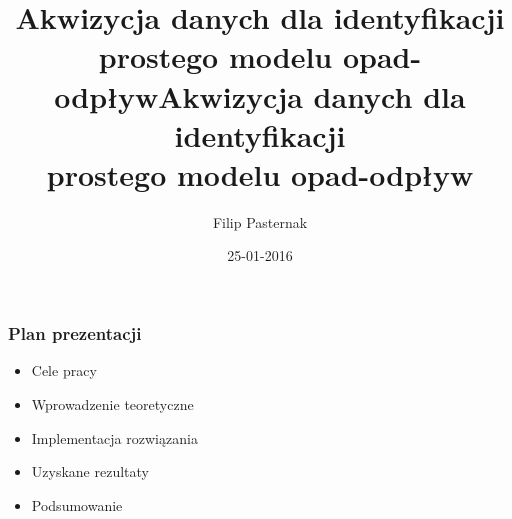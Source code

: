 \documentclass{beamer}
\title{Akwizycja danych dla identyfikacji prostego modelu opad-odpływ}
\title[]{Akwizycja danych dla identyfikacji \\ prostego modelu opad-odpływ}
\author[F. Pasternak]{Filip Pasternak}
\date[2016]{25-01-2016}
\institute[AGH]
{Promotor: dr inż Janusz Miller \\ Wydział EAIiIB}
\begin{document}
{
 \begin{frame}
   \titlepage
 \end{frame}
}




\begin{frame}
\frametitle{Plan prezentacji}
\begin{itemize}
\item{Cele pracy}
\item{Wprowadzenie teoretyczne}
\item{Implementacja rozwiązania}
\item{Uzyskane rezultaty}
\item{Podsumowanie}
\end{itemize}

\end{frame}

\end{document}
